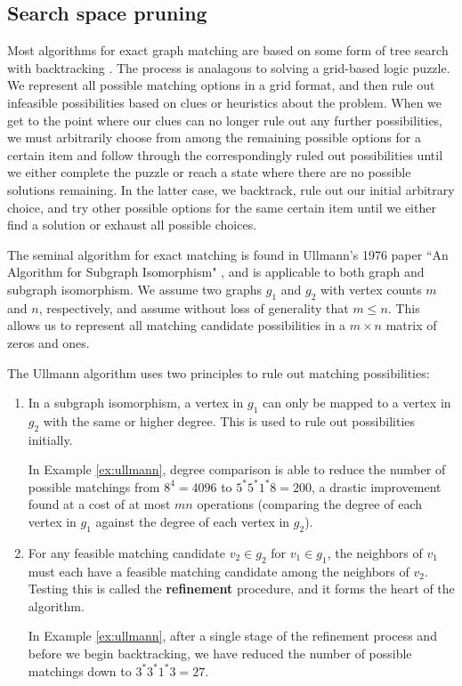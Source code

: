 \documentclass[12pt]{thesis}
\theoremstyle{plain}
\theoremstyle{definition}
\theoremstyle{remark}
\begin{document}
\subsection{Search space pruning}

Most algorithms for exact graph matching are based on some form of tree search with backtracking \cite{Conte_2004}. The process is analagous to  solving a grid-based logic puzzle. We represent all possible matching options in a grid format, and then rule out infeasible possibilities based on clues or heuristics about the problem. When we get to the point where our clues can no longer rule out any further possibilities, we must arbitrarily choose from among the remaining possible options for a certain item and follow through the correspondingly ruled out possibilities until we either complete the puzzle or reach a state where there are no possible solutions remaining. In the latter case, we backtrack, rule out our initial arbitrary choice, and try other possible options for the same certain item until we either find a solution or exhaust all possible choices.

The seminal algorithm for exact matching is found in Ullmann's 1976 paper ``An Algorithm for Subgraph Isomorphism" \cite{Ullmann_1976}, and is applicable to both graph and subgraph isomorphism. We assume two graphs $g_1$ and $g_2$ with vertex counts $m$ and $n$, respectively, and assume without loss of generality that $m\leq n$. This allows us to represent all matching candidate possibilities in a $m\times n$ matrix of zeros and ones.

The Ullmann algorithm uses two principles to rule out matching possibilities:

\begin{enumerate}
\item In a subgraph isomorphism, a vertex in $g_1$ can only be mapped to a vertex in $g_2$ with the same or higher degree. This is used to rule out possibilities initially. 

In Example \ref{ex:ullmann}, degree comparison is able to reduce the number of possible matchings from $8^4=4096$ to $5^*5^*1^*8=200$, a drastic improvement found at a cost of at most $mn$ operations (comparing the degree of each vertex in $g_1$ against the degree of each vertex in $g_2$).

\item For any feasible matching candidate $v_2\in g_2$ for $v_1\in g_1$, the neighbors of $v_1$ must each have a feasible matching candidate among the neighbors of $v_2$. Testing this is called the \textbf{refinement} procedure, and it forms the heart of the algorithm.

In Example \ref{ex:ullmann}, after a single stage of the refinement process and before we begin backtracking, we have reduced the number of possible matchings down to $3^*3^*1^*3=27$.
\end{enumerate}
\end{document}
